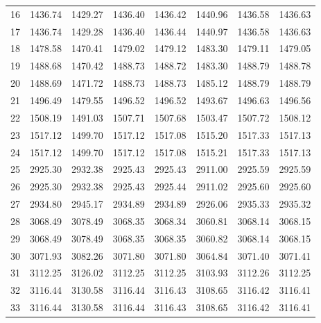\documentclass[10pt,oneside]{article}
\begin{document}
\begin{table}[h!]
\begin{tabular}{cccccccc}
16 &   1436.74 & 1429.27 & 1436.40 & 1436.42 &      1440.96 & 1436.58 & 1436.63 \\
17 &   1436.74 & 1429.28 & 1436.40 & 1436.44 &      1440.97 & 1436.58 & 1436.63 \\
18 &   1478.58 & 1470.41 & 1479.02 & 1479.12 &      1483.30 & 1479.11 & 1479.05 \\
19 &   1488.68 & 1470.42 & 1488.73 & 1488.72 &      1483.30 & 1488.79 & 1488.78 \\
20 &   1488.69 & 1471.72 & 1488.73 & 1488.73 &      1485.12 & 1488.79 & 1488.79 \\
21 &   1496.49 & 1479.55 & 1496.52 & 1496.52 &      1493.67 & 1496.63 & 1496.56 \\
22 &   1508.19 & 1491.03 & 1507.71 & 1507.68 &      1503.47 & 1507.72 & 1508.12 \\
23 &   1517.12 & 1499.70 & 1517.12 & 1517.08 &      1515.20 & 1517.33 & 1517.13 \\
24 &   1517.12 & 1499.70 & 1517.12 & 1517.08 &      1515.21 & 1517.33 & 1517.13 \\
25 &   2925.30 & 2932.38 & 2925.43 & 2925.43 &      2911.00 & 2925.59 & 2925.59 \\
26 &   2925.30 & 2932.38 & 2925.43 & 2925.44 &      2911.02 & 2925.60 & 2925.60 \\
27 &   2934.80 & 2945.17 & 2934.89 & 2934.89 &      2926.06 & 2935.33 & 2935.32 \\
28 &   3068.49 & 3078.49 & 3068.35 & 3068.34 &      3060.81 & 3068.14 & 3068.15 \\
29 &   3068.49 & 3078.49 & 3068.35 & 3068.35 &      3060.82 & 3068.14 & 3068.15 \\
30 &   3071.93 & 3082.26 & 3071.80 & 3071.80 &      3064.84 & 3071.40 & 3071.41 \\
31 &   3112.25 & 3126.02 & 3112.25 & 3112.25 &      3103.93 & 3112.26 & 3112.25 \\
32 &   3116.44 & 3130.58 & 3116.44 & 3116.43 &      3108.65 & 3116.42 & 3116.41 \\
33 &   3116.44 & 3130.58 & 3116.44 & 3116.43 &      3108.65 & 3116.42 & 3116.41 \\
\bottomrule
\end{tabular}
\end{table}

\clearpage
\end{document}
